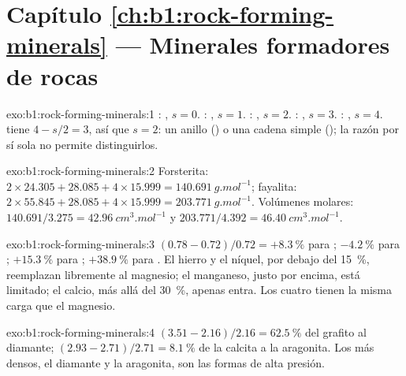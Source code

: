 \section*{Capítulo \ref{ch:b1:rock-forming-minerals} --- Minerales formadores de rocas}

\begin{solution}{exo:b1:rock-forming-minerals:1}
: , $s = 0$. : , $s = 1$. :
, $s = 2$. : , $s = 3$. : , $s = 4$.
 tiene $4 - s/2 = 3$, así que $s = 2$: un anillo () o una cadena simple
(); la razón por sí sola no permite distinguirlos.
\end{solution}

\begin{solution}{exo:b1:rock-forming-minerals:2}
Forsterita: $2\times24.305 + 28.085 + 4\times15.999 =
\qty{140.691}{g.mol^{-1}}$; fayalita: $2\times55.845 + 28.085 +
4\times15.999 = \qty{203.771}{g.mol^{-1}}$. Volúmenes molares:
$140.691/3.275 = \qty{42.96}{cm^3.mol^{-1}}$ y $203.771/4.392 =
\qty{46.40}{cm^3.mol^{-1}}$.
\end{solution}

\begin{solution}{exo:b1:rock-forming-minerals:3}
$(0.78 - 0.72)/0.72 = +\qty{8.3}{\percent}$ para ;
$-\qty{4.2}{\percent}$ para ; $+\qty{15.3}{\percent}$ para
; $+\qty{38.9}{\percent}$ para . El hierro y el níquel, por debajo del
\qty{15}{\percent}, reemplazan libremente al magnesio; el manganeso, justo por encima, está limitado; el calcio,
más allá del \qty{30}{\percent}, apenas entra. Los cuatro tienen la misma carga que el magnesio.
\end{solution}

\begin{solution}{exo:b1:rock-forming-minerals:4}
$(3.51 - 2.16)/2.16 = \qty{62.5}{\percent}$ del grafito al diamante;
$(2.93 - 2.71)/2.71 = \qty{8.1}{\percent}$ de la calcita a la aragonita. Los  más densos, el diamante y
la aragonita, son las formas de alta presión.
\end{solution}

